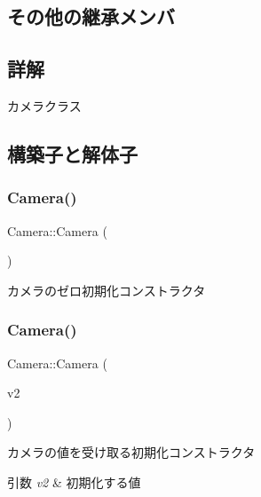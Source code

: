 \subsection*{その他の継承メンバ}


\subsection{詳解}
カメラクラス 

\subsection{構築子と解体子}
\mbox{\label{class_camera_a01f94c3543f56ede7af49dc778f19331}} 
\subsubsection{\texorpdfstring{Camera()}{Camera()}\hspace{0.1cm}{\footnotesize\ttfamily [1/2]}}
{\footnotesize\ttfamily Camera\+::\+Camera (\begin{DoxyParamCaption}{ }\end{DoxyParamCaption})}



カメラのゼロ初期化コンストラクタ 

\mbox{\label{class_camera_afe282ee51f1f39c041b0e7de9386cc6d}} 
\subsubsection{\texorpdfstring{Camera()}{Camera()}\hspace{0.1cm}{\footnotesize\ttfamily [2/2]}}
{\footnotesize\ttfamily Camera\+::\+Camera (\begin{DoxyParamCaption}\item[{const \mbox{\hyperlink{transform_8h_afb0c5e21d4133ff4f200992c0b534e1b}{V\+E\+C2}} \&}]{v2 }\end{DoxyParamCaption})}



カメラの値を受け取る初期化コンストラクタ 


\begin{DoxyParams}{引数}
{\em v2} & 初期化する値 \\
\hline
\end{DoxyParams}


